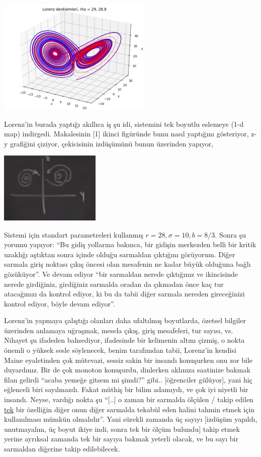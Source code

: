 \documentclass[12pt,fleqn]{article}\usepackage{../../common}
\begin{document}
\includegraphics[width=20em]{../chaos_17/17_01.png}

Lorenz'in burada yaptığı akıllıca iş şu idi, sistemini tek boyutlu eslemeye
(1-d map) indirgedi. Makalesinin [1] ikinci figüründe bunu nasıl yaptığını
gösteriyor, z-y grafiğini çiziyor, çekicisinin izdüşümünü bunun üzerinden
yapıyor,

\includegraphics[width=13em]{18_04.png}

Sistemi için standart parametreleri kullanmış $r=28,\sigma=10,b=8/3$. Sonra
şu yorumu yapıyor: ``Bu gidiş yollarına bakınca, bir gidişin merkezden
belli bir kritik uzaklığı aştıktan sonra içinde olduğu sarmaldan çıktığını
görüyorum. Diğer sarmala giriş noktası çıkış öncesi olan mesafenin ne kadar
büyük olduğuna bağlı gözüküyor''. Ve devam ediyor ``bir sarmaldan nerede
çıktığınız ve ikincisinde nerede girdiğiniz, girdiğiniz sarmalda oradan da
çıkmadan önce kaç tur atacağınızı da kontrol ediyor, ki bu da tabii diğer
sarmala nereden gireceğinizi kontrol ediyor, böyle devam ediyor''.

Lorenz'in yapmaya çalıştığı olanları daha ufaltılmış boyutlarda, özetsel
bilgiler üzerinden anlamaya uğraşmak, mesela çıkış, giriş mesafeleri, tur
sayısı, vs. Nihayet şu ifadeden bahsediyor, ifadesinde bir kelimenin altını
çizmiş, o nokta önemli o yüksek sesle söylenecek, benim tarafımdan tabii,
Lorenz'in kendisi Maine eyaletinden çok mütevazi, sessiz sakin bir insandı
konuşurken onu zor bile duyardınız. Bir de çok monoton konuşurdu, dinlerken
aklınıza saatinize bakmak filan gelirdi ``acaba yemeğe gitsem mi şimdi?''
gibi.. [öğrenciler gülüyor], yani hiç eğlenceli biri sayılmazdı. Fakat
müthiş bir bilim adamıydı, ve çok iyi niyetli bir insandı. Neyse, vardığı
nokta şu ``[..] o zaman bir sarmalda ölçülen / takip edilen \underline{tek}
bir özelliğin diğer onun diğer sarmalda tekabül eden halini tahmin etmek
için kullanılması mümkün olmalıdır''. Yani sürekli zamanda üç sayıyı
[izdüşüm yapıldı, unutmayalım, üç boyut ikiye indi, sonra tek bir ölçüm
bulundu] takip etmek yerine ayrıksal zamanda tek bir sayıya bakmak yeterli
olacak, ve bu sayı bir sarmaldan diğerine takip edilebilecek.
\end{document}
